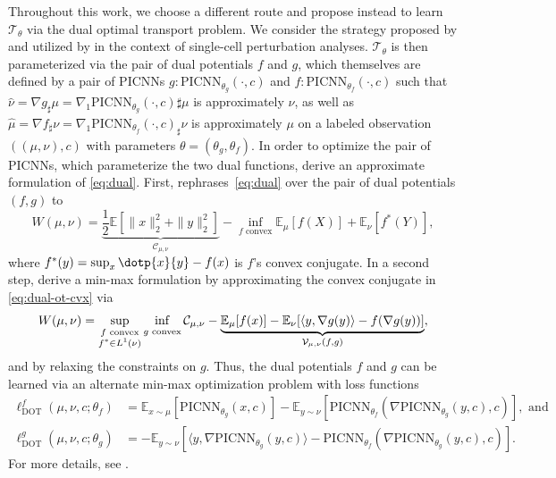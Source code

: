 Throughout this work, we choose a different route and propose instead to learn $\mathcal{T}_{\theta}$ via the dual optimal transport problem. We consider the strategy proposed by \citet{makkuva2020optimal} and utilized by \citet{bunne2021learning} in the context of single-cell perturbation analyses.
 $\mathcal{T}_{\theta}$ is then parameterized via the pair of dual potentials $f$ and $g$, which  themselves are defined by a pair of PICNNs $g:\text{PICNN}_{\theta_g}(\cdot,c)$ and $f:\text{PICNN}_{\theta_f}(\cdot,c)$ such that $\hat{\nu} = \nabla g _\sharp \mu = \nabla_1 \text{PICNN}_{\theta_g} (\cdot,c)\sharp \mu$ is approximately $\nu$, as well as $\hat{\mu} = \nabla f _\sharp \nu = \nabla_1 \text{PICNN}_{\theta_f} (\cdot, c)_\sharp\nu$ is approximately $\mu$ on a labeled observation $((\mu,\nu),c)$ with parameters $\theta = (\theta_g, \theta_f)$.
In order to optimize the pair of PICNNs, which parameterize the two dual functions, \citet{makkuva2020optimal} derive an approximate formulation of \eqref{eq:dual}.
First, \citet[Theorem 2.9]{villani2021topics} rephrases~\eqref{eq:dual} over the pair of dual potentials $(f, g)$ to
\begin{equation} \label{eq:dual-ot-cvx}
    W(\mu, \nu)= \underbrace{\frac{1}{2}\mathbb{E}\left[\|x\|_{2}^{2}+\|y\|_{2}^{2}\right]}_{\mathcal{C}_{\mu, \nu}}-\inf _{f \text{ convex}} \mathbb{E}_{\mu}[f(X)]+\mathbb{E}_{\nu}\left[f^{*}(Y)\right],
\end{equation}
where $f^*(y) = \sup_x \dotp{x}{y} - f(x)$ is $f$'s convex conjugate.
In a second step, \citet{makkuva2020optimal} derive a min-max formulation by approximating the convex conjugate in \eqref{eq:dual-ot-cvx} via
\begin{equation} \label{eq:ot-minmax}
    W(\mu, \nu)=\sup _{\substack{f  \text{ convex} \\ f^{*} \in L^{1}(\nu)}} \newinf _{g \text{ convex}}  \mathcal{C}_{\mu, \nu} - \underbrace{\mathbb{E}_{\mu}[f(x)]-\mathbb{E}_{\nu}[\langle y, \nabla g(y)\rangle-f(\nabla g(y))]}_{\mathcal{V}_{\mu, \nu}(f, g)},
\end{equation}
and by relaxing the constraints on $g$. 
Thus, the dual potentials $f$ and $g$ can be learned via an alternate min-max optimization problem with loss functions
\begin{align} 
    \ell_\text{DOT}^f(\mu, \nu, c; \theta_f) &= \mathbb{E}_{x \sim \mu}[\text{PICNN}_{\theta_g}(x, c)] - \mathbb{E}_{y \sim \nu}[\text{PICNN}_{\theta_f}(\nabla \text{PICNN}_{\theta_g}(y, c), c)], \text{ and }  \label{eq:makkuva_f_loss} \\
    \ell_\text{DOT}^g(\mu, \nu, c; \theta_g) &= -\mathbb{E}_{y \sim \nu}[\langle y, \nabla \text{PICNN}_{\theta_g}(y, c)\rangle-\text{PICNN}_{\theta_f}(\nabla \text{PICNN}_{\theta_g}(y, c), c)]. \label{eq:makkuva_g_loss}
\end{align}
For more details, see \citet{makkuva2020optimal, korotin2021neural}.

